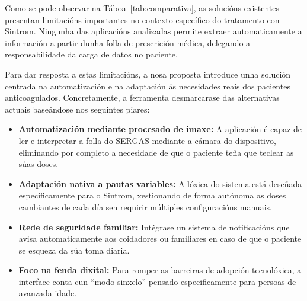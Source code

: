 \FloatBarrier

\begin{table}[hp!]
  \centering
  \caption{Comparativa de funcionalidades das aplicacións existentes e da nosa solución}
  \label{tab:comparativa}
\end{table}

Como se pode observar na Táboa~\ref{tab:comparativa}, as solucións existentes presentan limitacións importantes no contexto específico do tratamento con Sintrom. Ningunha das aplicacións analizadas permite extraer automaticamente a información a partir dunha folla de prescrición médica, delegando a responsabilidade da carga de datos no paciente.

Para dar resposta a estas limitacións, a nosa proposta introduce unha solución centrada na automatización e na adaptación ás necesidades reais dos pacientes anticoagulados. Concretamente, a ferramenta desmarcarase das alternativas actuais baseándose nos seguintes piares:

\begin{itemize}
    \item \textbf{Automatización mediante procesado de imaxe:} A aplicación é capaz de ler e interpretar a folla do SERGAS mediante a cámara do dispositivo, eliminando por completo a necesidade de que o paciente teña que teclear as súas doses.
    \item \textbf{Adaptación nativa a pautas variables:} A lóxica do sistema está deseñada especificamente para o Sintrom, xestionando de forma autónoma as doses cambiantes de cada día sen requirir múltiples configuracións manuais.
    \item \textbf{Rede de seguridade familiar:} Intégrase un sistema de notificacións que avisa automaticamente aos coidadores ou familiares en caso de que o paciente se esqueza da súa toma diaria.
    \item \textbf{Foco na fenda dixital:} Para romper as barreiras de adopción tecnolóxica, a interface conta cun ``modo sinxelo'' pensado especificamente para persoas de avanzada idade.
\end{itemize}

